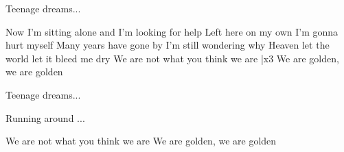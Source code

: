 \documentclass[../../../songbook.tex]{subfiles}
\begin{document}
\-\hspace{1cm} Teenage dreams...			 \newline

Now I'm sitting alone and I'm looking for help		  \newline
Left here on my own I'm gonna hurt myself			  \newline
Many years have gone by I'm still wondering why			 \newline
Heaven let the world let it bleed me dry				 \newline
We are not what you think we are	|x3		 \newline
We are golden, we are golden			 \newline

\-\hspace{1cm} Teenage dreams...			 \newline

Running around ...			 \newline

We are not what you think we are		 \newline
We are golden, we are golden    
\end{document}

